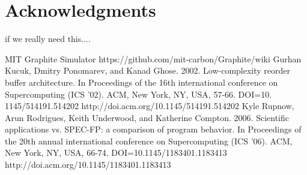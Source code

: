 \documentclass{acm_proc_article-sp}
\begin{document}
\section{Acknowledgments}
if we really need this....

\begin{thebibliography}{------}
	MIT Graphite Simulator
	https://github.com/mit-carbon/Graphite/wiki
Gurhan Kucuk, Dmitry Ponomarev, and Kanad Ghose. 2002. Low-complexity reorder buffer architecture. In Proceedings
of the 16th international conference on Supercomputing (ICS '02). ACM, New York, NY, USA, 57-66. DOI=10.
1145/514191.514202 http://doi.acm.org/10.1145/514191.514202
Kyle Rupnow, Arun Rodrigues, Keith Underwood, and Katherine Compton. 2006. Scientific applications vs. SPEC-FP: a comparison of program behavior. In Proceedings of the 20th annual international conference on Supercomputing (ICS '06). ACM, New York, NY, USA, 66-74. DOI=10.1145/1183401.1183413 http://doi.acm.org/10.1145/1183401.1183413 
\end{thebibliography}
\end{document}
